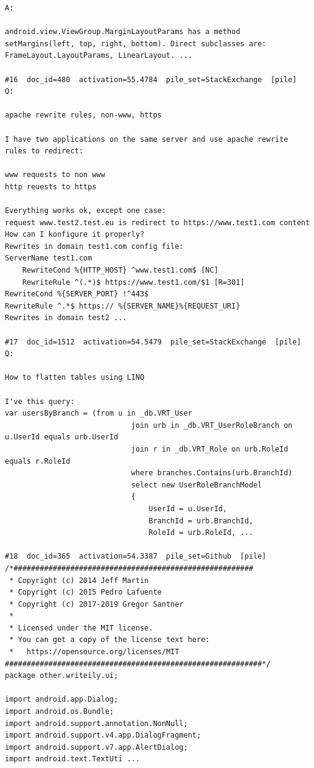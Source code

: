 \begin{verbatim}
A:

android.view.ViewGroup.MarginLayoutParams has a method setMargins(left, top, right, bottom). Direct subclasses are: FrameLayout.LayoutParams, LinearLayout. ...

#16  doc_id=480  activation=55.4784  pile_set=StackExchange  [pile]
Q:

apache rewrite rules, non-www, https

I have two applications on the same server and use apache rewrite rules to redirect:

www requests to non www
http reuests to https

Everything works ok, except one case:
request www.test2.test.eu is redirect to https://www.test1.com content
How can I konfigure it properly?
Rewrites in domain test1.com config file: 
ServerName test1.com
    RewriteCond %{HTTP_HOST} ^www.test1.com$ [NC]
    RewriteRule ^(.*)$ https://www.test1.com/$1 [R=301]
RewriteCond %{SERVER_PORT} !^443$
RewriteRule ^.*$ https:// %{SERVER_NAME}%{REQUEST_URI}
Rewrites in domain test2 ...

#17  doc_id=1512  activation=54.5479  pile_set=StackExchange  [pile]
Q:

How to flatten tables using LINQ

I've this query:
var usersByBranch = (from u in _db.VRT_User
                             join urb in _db.VRT_UserRoleBranch on u.UserId equals urb.UserId
                             join r in _db.VRT_Role on urb.RoleId equals r.RoleId
                             where branches.Contains(urb.BranchId)
                             select new UserRoleBranchModel
                             {
                                 UserId = u.UserId,
                                 BranchId = urb.BranchId,
                                 RoleId = urb.RoleId, ...

#18  doc_id=365  activation=54.3387  pile_set=Github  [pile]
/*#######################################################
 * Copyright (c) 2014 Jeff Martin
 * Copyright (c) 2015 Pedro Lafuente
 * Copyright (c) 2017-2019 Gregor Santner
 *
 * Licensed under the MIT license.
 * You can get a copy of the license text here:
 *   https://opensource.org/licenses/MIT
###########################################################*/
package other.writeily.ui;

import android.app.Dialog;
import android.os.Bundle;
import android.support.annotation.NonNull;
import android.support.v4.app.DialogFragment;
import android.support.v7.app.AlertDialog;
import android.text.TextUti ...


\end{verbatim}
